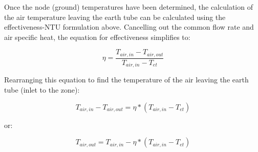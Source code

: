 Once the node (ground) temperatures have been determined, the calculation of the air temperature leaving the earth tube can be calculated using the effectiveness-NTU formulation above.  Cancelling out the common flow rate and air specific heat, the equation for effectiveness simplifies to:

\begin{equation}
\eta = \frac{T_{air,in} - T_{air,out}}{T_{air,in} - T_{et}}
\end{equation}

Rearranging this equation to find the temperature of the air leaving the earth tube (inlet to the zone):

\begin{equation}
T_{air,in} - T_{air,out} = \eta * (T_{air,in} - T_{et})
\end{equation}

or:

\begin{equation}
T_{air,out} = T_{air,in} - \eta * (T_{air,in} - T_{et})
\end{equation}

